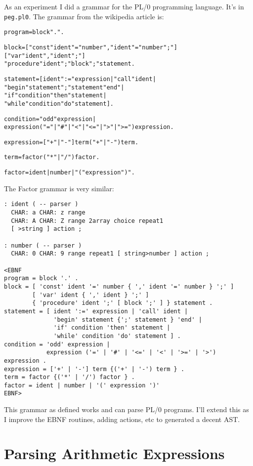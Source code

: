 As an experiment I did a grammar for the PL/0 programming
language. It's in \texttt{peg.pl0}. The grammar from the wikipedia article
is:
\begin{alltt}
program = block "." .

block = [ "const" ident "=" number {"," ident "=" number} ";"]
        [ "var" ident {"," ident} ";"]
        { "procedure" ident ";" block ";" } statement .

statement = [ ident ":=" expression | "call" ident |
            "begin" statement {";" statement } "end" |
            "if" condition "then" statement |
            "while" condition "do" statement ].

condition = "odd" expression |
            expression ("="|"#"|"<"|"<="|">"|">=") expression .

expression = [ "+"|"-"] term { ("+"|"-") term}.

term = factor {("*"|"/") factor}.

factor = ident | number | "(" expression ")".
\end{alltt}
The Factor grammar is very similar:
\begin{verbatim}
: ident ( -- parser )
  CHAR: a CHAR: z range 
  CHAR: A CHAR: Z range 2array choice repeat1 
  [ >string ] action ;

: number ( -- parser )
  CHAR: 0 CHAR: 9 range repeat1 [ string>number ] action ;

<EBNF
program = block '.' .
block = [ 'const' ident '=' number { ',' ident '=' number } ';' ]
        [ 'var' ident { ',' ident } ';' ]
        { 'procedure' ident ';' [ block ';' ] } statement .
statement = [ ident ':=' expression | 'call' ident |
              'begin' statement {';' statement } 'end' |
              'if' condition 'then' statement |
              'while' condition 'do' statement ] .
condition = 'odd' expression |
            expression ('=' | '#' | '<=' | '<' | '>=' | '>') expression .
expression = ['+' | '-'] term {('+' | '-') term } .
term = factor {('*' | '/') factor } .
factor = ident | number | '(' expression ')'
EBNF>
\end{verbatim}
This grammar as defined works and can parse PL/0 programs. I'll extend
this as I improve the EBNF routines, adding actions, etc to generated
a decent AST.

\section{Parsing Arithmetic Expressions}

